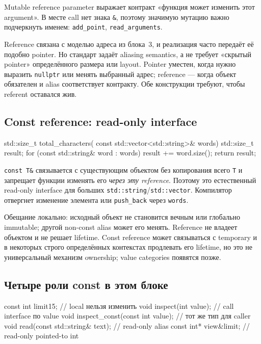 Mutable reference parameter выражает контракт «функция может изменить этот
argument». В месте call нет знака \texttt{\&}, поэтому значимую мутацию важно
подчеркнуть именем: \texttt{add\_point}, \texttt{read\_arguments}.

Reference связана с моделью адреса из блока~3, и реализация часто передаёт её
подобно pointer. Но стандарт задаёт aliasing semantics, а не требует
«скрытый pointer» определённого размера или layout. Pointer уместен, когда
нужно выразить \texttt{nullptr} или менять выбранный адрес; reference --- когда
объект обязателен и alias соответствует контракту. Обе конструкции требуют,
чтобы referent оставался жив.

\subsection{Const reference: read-only interface}

\begin{cppcode}
std::size_t total_characters(
    const std::vector<std::string>& words) {
    std::size_t result{};
    for (const std::string& word : words) {
        result += word.size();
    }
    return result;
}
\end{cppcode}

\texttt{const T\&} связывается с существующим объектом без копирования всего
\texttt{T} и запрещает функции изменять его \emph{через эту reference}.
Поэтому это естественный read-only interface для больших
\texttt{std::string}/\texttt{std::vector}. Компилятор отвергнет изменение
элемента или \texttt{push\_back} через \texttt{words}.

Обещание локально: исходный объект не становится вечным или глобально
immutable; другой non-const alias может его менять. Reference не владеет
объектом и не решает lifetime. Const reference может связываться с temporary и
в некоторых строго определённых контекстах продлевать его lifetime, но это не
универсальный механизм ownership; value categories появятся позже.

\subsection{Четыре роли const в этом блоке}

\begin{cppcode}
const int limit{15};                   // local нельзя изменить
void inspect(int value);               // call interface по value
void inspect_const(const int value);   // тот же тип для caller
void read(const std::string& text);     // read-only alias
const int* view{&limit};                // read-only pointed-to int
\end{cppcode}

